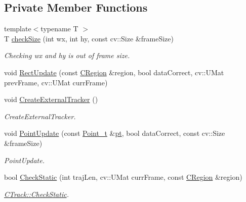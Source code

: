 \subsection*{Private Member Functions}
\begin{DoxyCompactItemize}
\item 
{\footnotesize template$<$typename T $>$ }\\T \mbox{\hyperlink{class_c_track_ac0482395bf6167103760098b324ca58c}{check\+Size}} (int wx, int hy, const cv\+::\+Size \&frame\+Size)
\begin{DoxyCompactList}\small\item\em Checking wx and hy is out of frame size. \end{DoxyCompactList}\item 
void \mbox{\hyperlink{class_c_track_a0f4fc1dc488e8ae339e988962dae6873}{Rect\+Update}} (const \mbox{\hyperlink{class_c_region}{C\+Region}} \&region, bool data\+Correct, cv\+::\+U\+Mat prev\+Frame, cv\+::\+U\+Mat curr\+Frame)
\item 
void \mbox{\hyperlink{class_c_track_ab7ffab3c66234eeb542d0411abfa24e6}{Create\+External\+Tracker}} ()
\begin{DoxyCompactList}\small\item\em Create\+External\+Tracker. \end{DoxyCompactList}\item 
void \mbox{\hyperlink{class_c_track_a19453a750a9ec71d6f3465f6031ad64b}{Point\+Update}} (const \mbox{\hyperlink{defines_8h_a8c42696da8f098b91374a8e8bb84b430}{Point\+\_\+t}} \&\mbox{\hyperlink{rings_8cpp_af69bbacaaf68a115b351c5d1e29c3cc8}{pt}}, bool data\+Correct, const cv\+::\+Size \&frame\+Size)
\begin{DoxyCompactList}\small\item\em Point\+Update. \end{DoxyCompactList}\item 
bool \mbox{\hyperlink{class_c_track_ab16e6724f0e9d22301d46efda587f567}{Check\+Static}} (int traj\+Len, cv\+::\+U\+Mat curr\+Frame, const \mbox{\hyperlink{class_c_region}{C\+Region}} \&region)
\begin{DoxyCompactList}\small\item\em \mbox{\hyperlink{class_c_track_ab16e6724f0e9d22301d46efda587f567}{C\+Track\+::\+Check\+Static}}. \end{DoxyCompactList}\end{DoxyCompactItemize}

